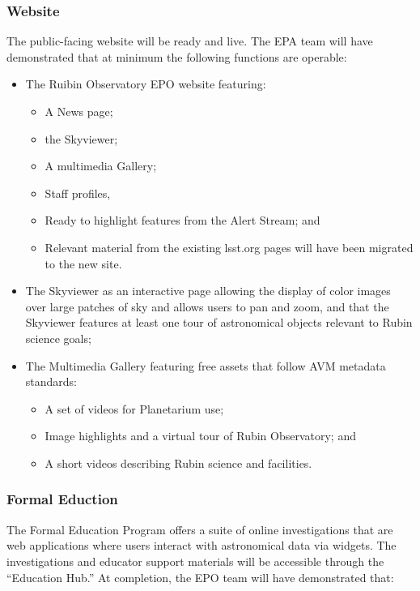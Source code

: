 \subsubsection{Website}

The public-facing website will be ready and live.  The EPA team will have demonstrated that at minimum the following functions are operable:

\begin{itemize} 
	\item The Ruibin Observatory EPO website featuring:
	\begin{itemize} 
		\item A News page;
		\item the Skyviewer;
		\item A multimedia Gallery;
		\item Staff profiles,
		\item Ready to highlight features from the Alert Stream; and 
		\item Relevant material from the existing lsst.org pages will have been migrated to the new site.
	\end{itemize}
	\item The Skyviewer as an interactive page allowing the display of color images over  large patches of sky and allows users to pan and zoom, and that the Skyviewer features at least one tour of astronomical objects relevant to Rubin science goals;
	\item The Multimedia Gallery featuring free assets that follow AVM metadata standards: 
	\begin{itemize}
		\item A set of videos for Planetarium use;
		\item Image highlights and a virtual tour of Rubin Observatory; and 
		\item A short videos describing Rubin science and facilities.
	\end{itemize}
\end{itemize}

\subsubsection{Formal Eduction}

The Formal Education Program offers a suite of online investigations that are web applications where users interact with astronomical data via widgets. The investigations and educator support materials will be accessible through the “Education Hub.”   At completion, the EPO team will have demonstrated that:  

